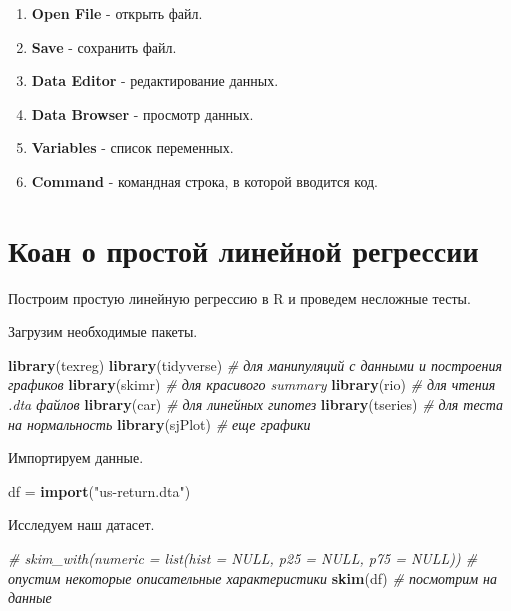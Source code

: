\documentclass[]{book}
\newenvironment{Shaded}{\begin{snugshade}}{\end{snugshade}}
\newcommand{\CommentTok}[1]{\textcolor[rgb]{0.56,0.35,0.01}{\textit{#1}}}
\newcommand{\KeywordTok}[1]{\textcolor[rgb]{0.13,0.29,0.53}{\textbf{#1}}}
\newcommand{\NormalTok}[1]{#1}
\newcommand{\StringTok}[1]{\textcolor[rgb]{0.31,0.60,0.02}{#1}}
\providecommand{\tightlist}{%
  \setlength{\itemsep}{0pt}\setlength{\parskip}{0pt}}
\begin{document}
\begin{enumerate}
\def\labelenumi{\arabic{enumi}.}
\tightlist
\item
  \textbf{Open File} - открыть файл.
\item
  \textbf{Save} - сохранить файл.
\item
  \textbf{Data Editor} - редактирование данных.
\item
  \textbf{Data Browser} - просмотр данных.
\item
  \textbf{Variables} - список переменных.
\item
  \textbf{Command} - командная строка, в которой вводится код.
\end{enumerate}

\hypertarget{simplereg}{%
\chapter{Коан о простой линейной регрессии}\label{simplereg}}

Построим простую линейную регрессию в R и проведем несложные тесты.

Загрузим необходимые пакеты.

\begin{Shaded}
\begin{Highlighting}[]
\KeywordTok{library}\NormalTok{(texreg)}
\KeywordTok{library}\NormalTok{(tidyverse) }\CommentTok{# для манипуляций с данными и построения графиков}
\KeywordTok{library}\NormalTok{(skimr) }\CommentTok{# для красивого summary}
\KeywordTok{library}\NormalTok{(rio) }\CommentTok{# для чтения .dta файлов}
\KeywordTok{library}\NormalTok{(car) }\CommentTok{# для линейных гипотез}
\KeywordTok{library}\NormalTok{(tseries) }\CommentTok{# для теста на нормальность}
\KeywordTok{library}\NormalTok{(sjPlot) }\CommentTok{# еще графики}
\end{Highlighting}
\end{Shaded}

Импортируем данные.

\begin{Shaded}
\begin{Highlighting}[]
\NormalTok{df =}\StringTok{ }\KeywordTok{import}\NormalTok{(}\StringTok{"us-return.dta"}\NormalTok{)}
\end{Highlighting}
\end{Shaded}

Исследуем наш датасет.

\begin{Shaded}
\begin{Highlighting}[]
\CommentTok{# skim_with(numeric = list(hist = NULL, p25 = NULL, p75 = NULL)) # опустим некоторые описательные характеристики}
\KeywordTok{skim}\NormalTok{(df) }\CommentTok{# посмотрим на данные}
\end{Highlighting}
\end{Shaded}
\end{document}
